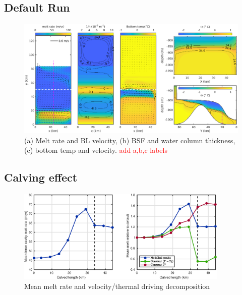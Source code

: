 \documentclass[draft]{agujournal2019}
\newcommand{\red}[1]{\textcolor{red}{#1}}
\begin{document}
\subsection{Default Run}
\begin{figure}
    \centering
    \includegraphics[width = \textwidth]{../make_figures/plots/figure3.eps}
    \caption{(a) Melt rate and BL velocity, (b) BSF and water column thickness, (c) bottom temp and velocity. \red{add a,b,c labels}}
    \label{fig:figure3}
\end{figure}

\subsection{Calving effect}
\begin{figure}
    \centering
    \includegraphics[width = 0.9\textwidth]{../make_figures/plots/figure4.eps}
    \caption{Mean melt rate and velocity/thermal driving decomposition}
    \label{fig:fig4}
\end{figure}
\end{document}
